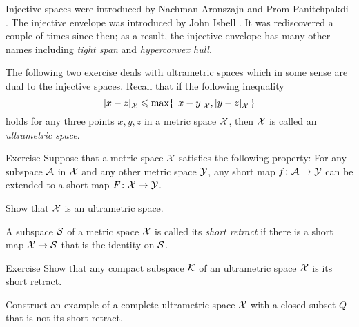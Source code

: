 Injective spaces were introduced by Nachman Aronszajn and Prom Panitchpakdi \cite{aronszajn-panitchpakdi}.
The injective envelope was introduced by John Isbell \cite{isbell}.
It was rediscovered a couple of times since then;
as a result, the injective envelope has many other names including \emph{tight span} and \emph{hyperconvex hull}.

The following two exercise deals with ultrametric spaces which in some sense are dual to the injective spaces. 
Recall that if the following inequality
\[\dist{x}{z}{\spc{X}}
\le
\max\{\,\dist{x}{y}{\spc{X}},\dist{y}{z}{\spc{X}}\,\}\]
holds for any three points $x,y,z$ in a metric space $\mathcal{X}$,
then $\mathcal{X}$ is called an \emph{ultrametric space}.

\begin{thm}{Exercise}\label{ex:ultrametric}
Suppose that a metric space $\mathcal{X}$ satisfies the following property:
For any subspace $\mathcal{A}$ in $\mathcal{X}$ and any other metric space $\mathcal{Y}$, any short map $f\colon\mathcal{A}\to \mathcal{Y}$ can be extended to a short map $F\colon\mathcal{X}\to \mathcal{Y}$.

Show that $\mathcal{X}$ is an ultrametric space.
\end{thm}

A subspace $\mathcal{S}$ of a metric space $\mathcal{X}$ is called its \emph{short retract} if there is a short map $\mathcal{X}\to \mathcal{S}$ that is the identity on $\mathcal{S}$.

\begin{thm}{Exercise}\label{ex:ultrametric-converse}
Show that any compact subspace $\mathcal{K}$ of an ultrametric space $\mathcal{X}$ is its short retract.

Construct an example of a complete ultrametric space $\mathcal{X}$ with a closed subset $Q$ that is not its short retract.
\end{thm}

